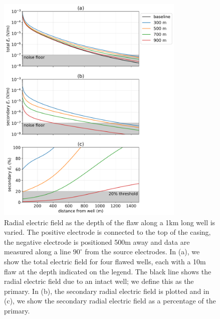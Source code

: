 \begin{figure}
    \begin{center}
    \includegraphics[width=0.8\textwidth]{figures/dc_casing/integrity_depth.png}
    \end{center}
\caption{
    Radial electric field as the depth of the flaw along a 1km long well is varied.
    The positive electrode is connected to the top of the casing, the negative electrode
    is positioned 500m away and data are measured along a line $90^\circ$ from the
    source electrodes. In (a), we show the total electric field for four flawed wells,
    each with a 10m flaw at the depth indicated on the legend. The black line shows
    the radial electric field due to an intact well; we define this as the primary.
    In (b), the secondary radial electric field is plotted and in (c), we show the
    secondary radial electric field as a percentage of the primary.
}
\label{fig:integrity_depth}
\end{figure}
